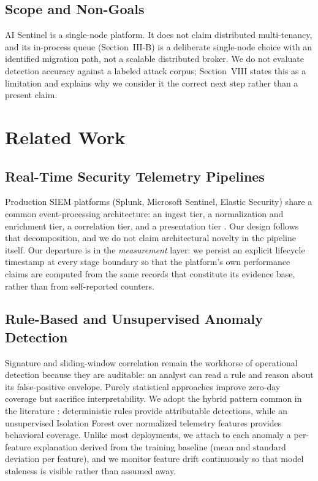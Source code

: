 \documentclass[conference]{IEEEtran}
\begin{document}
\subsection{Scope and Non-Goals}

AI Sentinel is a single-node platform. It does not claim distributed
multi-tenancy, and its in-process queue (Section~III-B) is a deliberate
single-node choice with an identified migration path, not a scalable
distributed broker. We do not evaluate detection accuracy against a labeled
attack corpus; Section~VIII states this as a limitation and explains why we
consider it the correct next step rather than a present claim.

\section{Related Work}

\subsection{Real-Time Security Telemetry Pipelines}

Production SIEM platforms (Splunk, Microsoft Sentinel, Elastic Security)
share a common event-processing architecture: an ingest tier, a normalization
and enrichment tier, a correlation tier, and a presentation tier \cite{ocs2016survey}.
Our design follows that decomposition, and we do not claim architectural
novelty in the pipeline itself. Our departure is in the \emph{measurement}
layer: we persist an explicit lifecycle timestamp at every stage boundary so
that the platform's own performance claims are computed from the same records
that constitute its evidence base, rather than from self-reported counters.

\subsection{Rule-Based and Unsupervised Anomaly Detection}

Signature and sliding-window correlation remain the workhorse of operational
detection because they are auditable: an analyst can read a rule and reason
about its false-positive envelope. Purely statistical approaches improve
zero-day coverage but sacrifice interpretability. We adopt the hybrid
pattern common in the literature \cite{ocs2016survey}: deterministic rules
provide attributable detections, while an unsupervised Isolation Forest
\cite{liu2008isolation} over normalized telemetry features provides
behavioral coverage. Unlike most deployments, we attach to each anomaly a
per-feature explanation derived from the training baseline (mean and standard
deviation per feature), and we monitor feature drift continuously so that
model staleness is visible rather than assumed away.
\end{document}
